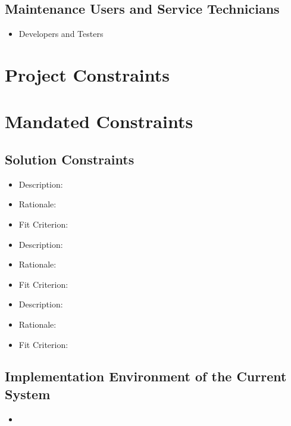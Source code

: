 \documentclass{article}
\begin{document}
\subsection{Maintenance Users and Service Technicians}
\begin{itemize}
\item
Developers and Testers
\end{itemize}

\section*{Project Constraints}

\section{Mandated Constraints}

\subsection{Solution Constraints}
\begin{itemize}

\item
Description:

\item
Rationale:

\item
Fit Criterion:

\item
Description:

\item
Rationale:

\item
Fit Criterion:

\item
Description:

\item
Rationale:

\item
Fit Criterion:

\end{itemize}

\subsection{Implementation Environment of the Current System}

\begin{itemize}
\item
\end{itemize}
\end{document}

